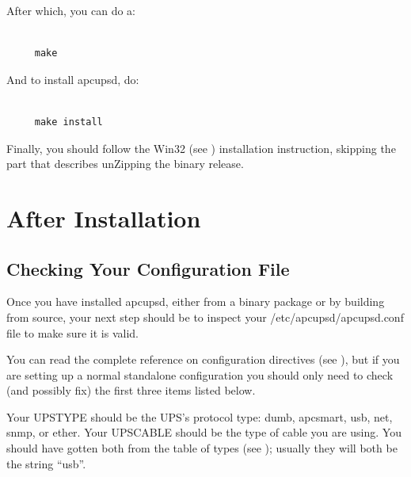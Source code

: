 After which, you can do a: 

\footnotesize
\begin{verbatim}
     
     make
\end{verbatim}
\normalsize

And to install apcupsd, do: 

\footnotesize
\begin{verbatim}
     
     make install
\end{verbatim}
\normalsize

Finally, you should follow the Win32 (see 
)
installation instruction, skipping the part that describes unZipping the
binary release. 

\label{After-Installation}

\section*{After Installation}

\label{index-After-Installation-57}
\label{index-Installation_002c-After-installing-58}

\label{Checking-Your-Configuration-File}

\subsection*{Checking Your Configuration File}

\label{index-Checking-Conf-file-59}
Once you have installed apcupsd, either from a binary package or by building
from source, your next step should be to inspect your
/etc/apcupsd/apcupsd.conf file to make sure it is valid.  

You can read the complete reference on configuration directives (see 
), but if you are
setting up a normal standalone configuration you should only need to check
(and possibly fix) the first three items listed below.  

Your UPSTYPE should be the UPS's protocol type: dumb, apcsmart, usb, net,
snmp, or ether.  Your UPSCABLE should be the type of cable you are using.  You
should have gotten both from the table of types (see 
); usually they will both be the
string ``usb''.  


